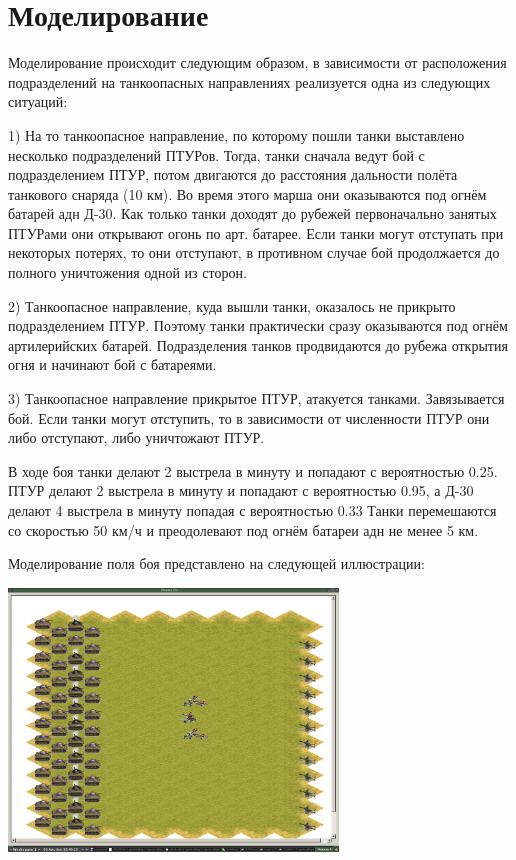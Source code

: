 \documentclass{cw1}
\begin{document}
\section{Моделирование}
Моделирование происходит следующим образом, в зависимости от расположения подразделений на танкоопасных направлениях 
реализуется одна из следующих ситуаций:


1) На то танкоопасное направление, по которому пошли танки выставлено несколько подразделений ПТУРов. Тогда, танки 
сначала ведут бой с подразделением ПТУР, потом двигаются до расстояния дальности полёта танкового снаряда (10 км). 
Во время этого марша они оказываются под огнём батарей адн Д-30. Как только танки доходят до рубежей первоначально 
занятых ПТУРами они открывают огонь по арт. батарее. Если танки могут отступать при некоторых потерях, то они 
отступают, в противном случае бой продолжается до полного уничтожения одной из сторон.


2) Танкоопасное направление, куда вышли танки, оказалось не прикрыто подразделением ПТУР. Поэтому танки практически 
сразу оказываются под огнём артилерийских батарей. Подразделения танков продвидаются до рубежа открытия огня и начинают 
бой с батареями. 


3) Танкоопасное направление прикрытое ПТУР, атакуется танками. Завязывается бой. Если танки могут отступить, то в 
зависимости от численности ПТУР они либо отступают, либо уничтожают ПТУР. 

В ходе боя танки делают 2 выстрела в минуту и попадают с вероятностью 0.25. ПТУР делают 2 выстрела в минуту и попадают
 с вероятностью 0.95, а Д-30 делают 4 выстрела в минуту попадая с вероятностью 0.33
Танки перемешаются со скоростью 50 км/ч и преодолевают под огнём батареи адн не менее 5 км.

Моделирование поля боя представлено на следующей иллюстрации:

\begin{center}
\includegraphics[height=70mm]{img2.png}
\end{center}
\end{document}
